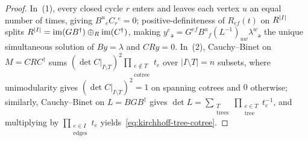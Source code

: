 \begin{proof}
In~(1), every closed cycle $r$ enters and leaves each vertex $u$ an equal number of times, giving $B^u{}_e C_r{}^e = 0$; positive-definiteness of $R_{ef}(t)$ on $R^{|I|}$ splits $R^{|I|} = \operatorname{im}(G B^\dagger) \oplus_R \operatorname{im}(C^\dagger)$, making $y^e{}_{\mathsf{a}} = G^{ef}B^u{}_f(L^{-1})_{uw}\lambda^w{}_{\mathsf{a}}$ the unique simultaneous solution of $B y = \lambda$ and $C R y = 0$. In~(2), Cauchy--Binet on $M = C R C^\dagger$ sums $(\det C|_{I\setminus T})^2\prod_{\substack{e\notin T\\\mathrm{cotree}}}t_e$ over $|I\setminus T| = n$ subsets, where unimodularity gives $(\det C|_{I\setminus T})^2 = 1$ on spanning cotrees and $0$ otherwise; similarly, Cauchy--Binet on $L = B G B^\dagger$ gives $\det L = \sum_{\substack{T\\\mathrm{trees}}}\prod_{\substack{e\in T\\\mathrm{tree}}}t_e^{-1}$, and multiplying by $\prod_{\substack{e\in I\\\mathrm{edges}}}t_e$ yields~\eqref{eq:kirchhoff-tree-cotree}.
\end{proof}
